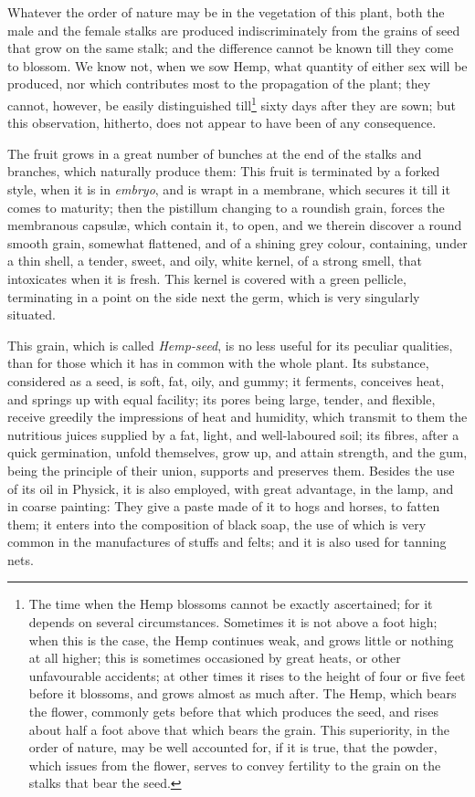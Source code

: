 \documentclass[a4paper, 11pt, oneside, polutonikogreek, english]{article}
\begin{document}
Whatever the order of nature may be in the vegetation of this plant, both the male and the female stalks are produced indiscriminately from the grains of seed that grow on the same stalk; and the difference cannot be known till they come to blossom. We know not, when we sow Hemp, what quantity of either sex will be produced, nor which contributes most to the propagation of the plant; they cannot, however, be easily distinguished till\footnote{The time when the Hemp blossoms cannot be exactly ascertained; for it depends on several circumstances. Sometimes it is not above a foot high; when this is the case, the Hemp continues weak, and grows little or nothing at all higher; this is sometimes occasioned by great heats, or other unfavourable accidents; at other times it rises to the height of four or five feet before it blossoms, and grows almost as much after. The Hemp, which bears the flower, commonly gets before that which produces the seed, and rises about half a foot above that which bears the grain. This superiority, in the order of nature, may be well accounted for, if it is true, that the powder, which issues from the flower, serves to convey fertility to the grain on the stalks that bear the seed.} sixty days after they are sown; but this observation, hitherto, does not appear to have been of any consequence.

The fruit grows in a great number of bunches at the end of the stalks and branches, which naturally produce them: This fruit is terminated by a forked style, when it is in \emph{embryo}, and is wrapt in a membrane, which secures it till it comes to maturity; then the pistillum changing to a roundish grain, forces the membranous capsulæ, which contain it, to open, and we therein discover a round smooth grain, somewhat flattened, and of a shining grey colour, containing, under a thin shell, a tender, sweet, and oily, white kernel, of a strong smell, that intoxicates when it is fresh. This kernel is covered with a green pellicle, terminating in a point on the side next the germ, which is very singularly situated.

This grain, which is called \emph{Hemp-seed}, is no less useful for its peculiar qualities, than for those which it has in common with the whole plant. Its substance, considered as a seed, is soft, fat, oily, and gummy; it ferments, conceives heat, and springs up with equal facility; its pores being large, tender, and flexible, receive greedily the impressions of heat and humidity, which transmit to them the nutritious juices supplied by a fat, light, and well-laboured soil; its fibres, after a quick germination, unfold themselves, grow up, and attain strength, and the gum, being the principle of their union, supports and preserves them. Besides the use of its oil in Physick, it is also employed, with great advantage, in the lamp, and in coarse painting: They give a paste made of it to hogs and horses, to fatten them; it enters into the composition of black soap, the use of which is very common in the manufactures of stuffs and felts; and it is also used for tanning nets.
\end{document}
